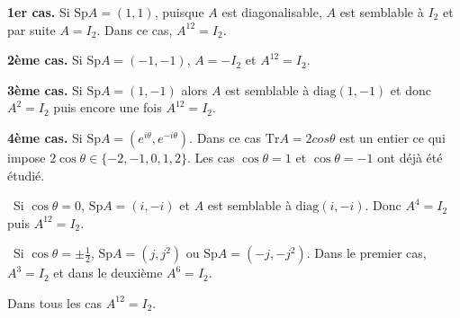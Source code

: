{\begin{enumerate}
{\textbf{1er cas.} Si $\text{Sp}A =(1,1)$, puisque $A$ est diagonalisable, $A$ est semblable à $I_2$ et par suite $A = I_2$. Dans ce cas, $A^{12}= I_2$.

\textbf{2ème cas.} Si $\text{Sp}A = (-1,-1)$, $A = -I_2$ et $A^{12}=I_2$.

\textbf{3ème cas.} Si $\text{Sp}A = (1,-1)$ alors $A$ est semblable à $\text{diag}(1,-1)$ et donc $A^2 = I_2$ puis encore une fois $A^{12}= I_2$.

\textbf{4ème cas.} Si $\text{Sp}A =(e^{i\theta},e^{-i\theta})$. Dans ce cas $\text{Tr}A = 2cos\theta$ est un entier ce qui impose $2\cos\theta\in\{-2,-1,0,1,2\}$. Les cas $\cos\theta= 1$ et $\cos\theta=-1$ ont déjà été étudié.

\textbullet~Si $\cos\theta= 0$, $\text{Sp}A=(i,-i)$ et $A$ est semblable à $\text{diag}(i,-i)$. Donc $A^4 =I_2$ puis $A^{12}= I_2$.

\textbullet~Si $\cos\theta=\pm\frac{1}{2}$, $\text{Sp}A=(j,j^2)$ ou $\text{Sp}A=(-j,-j^2)$. Dans le premier cas, $A^3 = I_2$ et dans le deuxième $A^6 = I_2$.

Dans tous les cas $A^{12}= I_2$.}
\end{enumerate}
}
